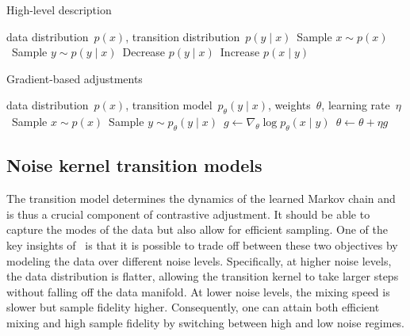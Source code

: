 \documentclass[10pt,twocolumn,letterpaper]{article}
\begin{document}
\begin{algorithm}[t]
  \caption{High-level description}\label{alg:ca:high-level}
  \begin{algorithmic}
     data distribution~$p(x)$, transition distribution~$p(y \mid x)$\REPEAT \STATE~Sample $x \sim p(x)$\STATE~Sample $y \sim p(y \mid x)$\STATE~Decrease $p(y \mid x)$\STATE~Increase $p(x \mid y)$\end{algorithmic}
\end{algorithm}

\begin{algorithm}[t]
  \caption{Gradient-based adjustments}\label{alg:ca:gradient}
  \begin{algorithmic}
     data distribution~$p(x)$, transition model~$p_{\theta}(y \mid x)$, weights~$\theta$, learning rate~$\eta$\REPEAT \STATE~Sample $x \sim p(x)$\STATE~Sample $y \sim p_{\theta}(y \mid x)$\STATE~$g \gets \nabla_{\theta} \log p_{\theta}(x \mid y)$\STATE~$\theta \gets \theta + \eta g$\end{algorithmic}
\end{algorithm}


\subsection{Noise kernel transition models}\label{sec:ca:noise-kernel}

The transition model determines the dynamics of the learned Markov chain and is thus a crucial component of contrastive adjustment.
It should be able to capture the modes of the data but also allow for efficient sampling.
One of the key insights of~\textcite{song2019generative} is that it is possible to trade off between these two objectives by modeling the data over different noise levels.
Specifically, at higher noise levels, the data distribution is flatter, allowing the transition kernel to take larger steps without falling off the data manifold.
At lower noise levels, the mixing speed is slower but sample fidelity higher.
Consequently, one can attain both efficient mixing and high sample fidelity by switching between high and low noise regimes.
\end{document}
